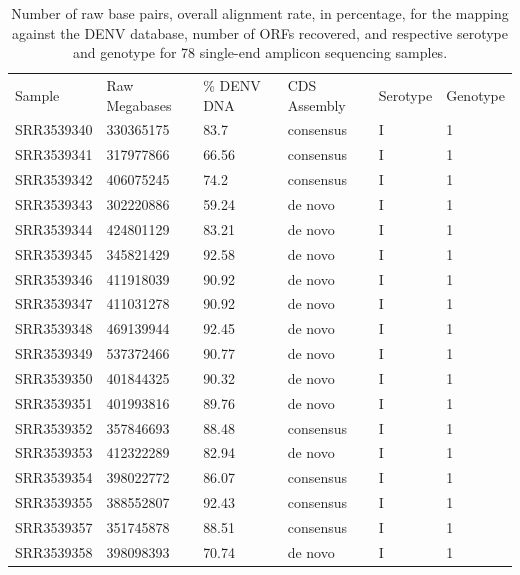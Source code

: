 \begin{longtable}{@{}llllll@{}}
\caption{Number of raw base pairs, overall alignment rate, in percentage, for the mapping against the DENV database, number of ORFs recovered, and respective serotype and genotype for 78 single-end amplicon sequencing samples.}
\label{tab:chap4_s6}\\
Sample     & Raw Megabases & \% DENV DNA & CDS Assembly & Serotype & Genotype \\
SRR3539340 & 330365175     & 83.7        & consensus    & I        & 1        \\
SRR3539341 & 317977866     & 66.56       & consensus    & I        & 1        \\
SRR3539342 & 406075245     & 74.2        & consensus    & I        & 1        \\
SRR3539343 & 302220886     & 59.24       & de novo      & I        & 1        \\
SRR3539344 & 424801129     & 83.21       & de novo      & I        & 1        \\
SRR3539345 & 345821429     & 92.58       & de novo      & I        & 1        \\
SRR3539346 & 411918039     & 90.92       & de novo      & I        & 1        \\
SRR3539347 & 411031278     & 90.92       & de novo      & I        & 1        \\
SRR3539348 & 469139944     & 92.45       & de novo      & I        & 1        \\
SRR3539349 & 537372466     & 90.77       & de novo      & I        & 1        \\
SRR3539350 & 401844325     & 90.32       & de novo      & I        & 1        \\
SRR3539351 & 401993816     & 89.76       & de novo      & I        & 1        \\
SRR3539352 & 357846693     & 88.48       & consensus    & I        & 1        \\
SRR3539353 & 412322289     & 82.94       & de novo      & I        & 1        \\
SRR3539354 & 398022772     & 86.07       & consensus    & I        & 1        \\
SRR3539355 & 388552807     & 92.43       & consensus    & I        & 1        \\
SRR3539357 & 351745878     & 88.51       & consensus    & I        & 1        \\
SRR3539358 & 398098393     & 70.74       & de novo      & I        & 1        \\

\end{longtable}
